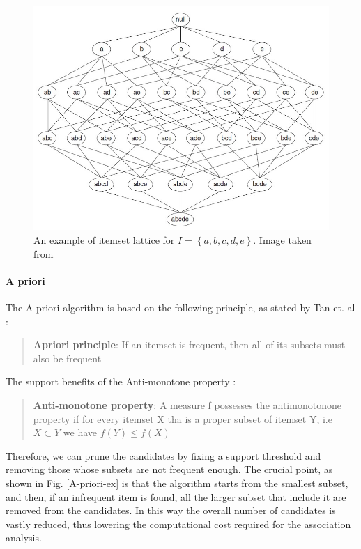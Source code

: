 \documentclass[12pt,%
               a4paper,%
               oneside,openany,%
               titlepage,%
               headinclude,footinclude,%
               BCOR5mm,%
               cleardoublepage=empty,%
               tablecaptionabove,%
               floatperchapter,
               ]{scrreprt}                 %
\begin{document}
\begin{figure}
\begin{center}
\includegraphics[width=\textwidth]{Figures/itemset_lattice.jpg}
\caption{An example of itemset lattice for $I=\left\lbrace a,b,c,d,e\right\rbrace$. Image taken from \cite{tan2019introduction}}
\label{itemset_lattice}
\end{center}
\end{figure}

\paragraph{A priori}

The A-priori algorithm is based on the following principle, as stated by Tan et. al \cite{tan2019introduction}:

\begin{quote}
\textbf{Apriori principle}: If an itemset is frequent, then all of its subsets must also be frequent
\end{quote}

The support benefits of the Anti-monotone property \cite{tan2019introduction}:

\begin{quote}
\textbf{Anti-monotone property}: A measure f possesses the antimonotonone property if for every itemset X tha is a proper subset of itemset Y, i.e $X \subset Y $ we have $f(Y) \leq f(X) $
\end{quote}

Therefore, we can prune the candidates by fixing a support threshold and removing those whose subsets are not frequent enough. The crucial point, as shown in Fig. \ref{A-priori-ex} is that the algorithm starts from the smallest subset, and then, if an infrequent item is found, all the larger subset that include it are removed from the candidates. In this way the overall number of candidates is vastly reduced, thus lowering the computational cost required for the association analysis.
\end{document}
